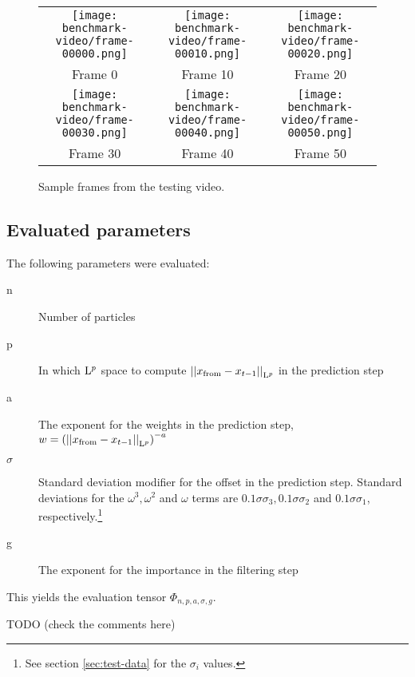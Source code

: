 \begin{figure}
  \centering
  \begin{tabular}{ccc}
    \texttt{[image: benchmark-video/frame-00000.png]} &
    \texttt{[image: benchmark-video/frame-00010.png]} &
    \texttt{[image: benchmark-video/frame-00020.png]}\\
    Frame 0 & Frame 10 & Frame 20\\
    \texttt{[image: benchmark-video/frame-00030.png]} &
    \texttt{[image: benchmark-video/frame-00040.png]} &
    \texttt{[image: benchmark-video/frame-00050.png]}\\
    Frame 30 & Frame 40 & Frame 50
  \end{tabular}
  \caption{Sample frames from the testing video.}
  \label{fig:benchmark-video}
\end{figure}  


\subsection{Evaluated parameters}
The following parameters were evaluated:

\begin{description}
\item[n] Number of particles
\item[p] In which $\mathrm{L}^{p}$ space to compute $\left\vert\left\vert x_{\text{from}} - x_{t-1}\right\vert\right\vert_{\mathrm{L}^{p}}$ in
  the prediction step
\item[a] The exponent for the weights in the prediction step, $w =
  \left(\left\vert\left\vert x_{\text{from}} - x_{t-1}\right\vert\right\vert_{\mathrm{L}^{p}}\right)^{-a}$
\item[$\sigma$] Standard deviation modifier for the offset in the
  prediction step. Standard deviations for the $\omega^3, \omega^2$
  and $\omega$ terms are $0.1\sigma\sigma_3, 0.1\sigma\sigma_2$ and
  $0.1\sigma\sigma_1$, respectively.\footnote{See section
    \ref{sec:test-data} for the $\sigma_i$ values.}
\item[g] The exponent for the importance in the filtering step
\end{description}

This yields the evaluation tensor $\Phi_{n,p,a,\sigma,g}$.

TODO (check the comments here)

